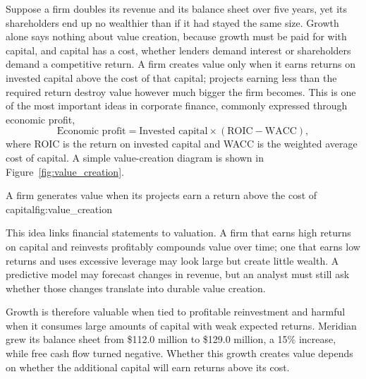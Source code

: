 \documentclass[../ai_in_finance]{subfiles}
\begin{document}
Suppose a firm doubles its revenue and its balance sheet over five years, yet its shareholders end up no wealthier than if it had stayed the same size. Growth alone says nothing about value creation, because growth must be paid for with capital, and capital has a cost, whether lenders demand interest or shareholders demand a competitive return. A firm creates value only when it earns returns on invested capital above the cost of that capital; projects earning less than the required return destroy value however much bigger the firm becomes. This is one of the most important ideas in corporate finance, commonly expressed through economic profit,
\begin{equation}
\text{Economic profit} = \text{Invested capital} \times (\text{ROIC} - \text{WACC}),\label{eq:statements-economic-profit}
\end{equation}
where ROIC is the return on invested capital and WACC is the weighted average cost of capital. A simple value-creation diagram is shown in Figure~\ref{fig:value_creation}.

\begin{bookfigure}[htbp]{A firm generates value when its projects earn a return above the cost of capital}{fig:value_creation}
\end{bookfigure}

This idea links financial statements to valuation. A firm that earns high returns on capital and reinvests profitably compounds value over time; one that earns low returns and uses excessive leverage may look large but create little wealth. A predictive model may forecast changes in revenue, but an analyst must still ask whether those changes translate into durable value creation.

Growth is therefore valuable when tied to profitable reinvestment and harmful when it consumes large amounts of capital with weak expected returns. Meridian grew its balance sheet from \$112.0 million to \$129.0 million, a 15\% increase, while free cash flow turned negative. Whether this growth creates value depends on whether the additional capital will earn returns above its cost.
\end{document}
